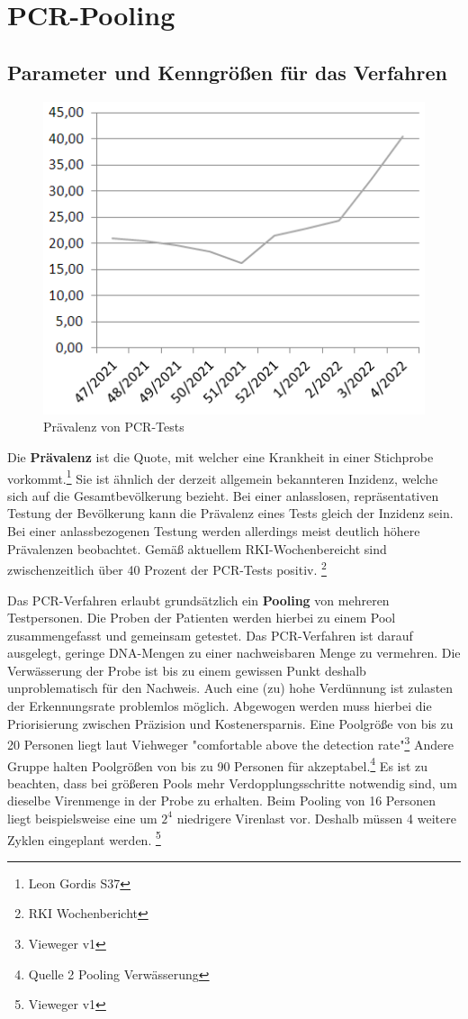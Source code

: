 \cleardoublepage
\chapter{PCR-Pooling}
\section{Parameter und Kenngrößen für das Verfahren}
\begin{figure}
	\includegraphics[width=.44\textwidth]{img/RKI_PCR_Positivrate}
	\caption{Prävalenz von PCR-Tests}
\end{figure}
Die \textbf{Prävalenz} ist die Quote, mit welcher eine Krankheit in einer Stichprobe vorkommt.\footnote{Leon Gordis S37}
Sie ist ähnlich der derzeit allgemein bekannteren Inzidenz, welche sich auf die Gesamtbevölkerung bezieht.
Bei einer anlasslosen, repräsentativen Testung der Bevölkerung kann die Prävalenz eines Tests gleich der Inzidenz sein.
Bei einer anlassbezogenen Testung werden allerdings meist deutlich höhere Prävalenzen beobachtet.
Gemäß aktuellem RKI-Wochenbereicht sind zwischenzeitlich über 40 Prozent der PCR-Tests positiv.
\footnote{RKI Wochenbericht}

Das PCR-Verfahren erlaubt grundsätzlich ein \textbf{Pooling} von mehreren Testpersonen.
Die Proben der Patienten werden hierbei zu einem Pool zusammengefasst und gemeinsam getestet.
Das PCR-Verfahren ist darauf ausgelegt, geringe DNA-Mengen zu einer nachweisbaren Menge zu vermehren.
Die Verwässerung der Probe ist bis zu einem gewissen Punkt deshalb unproblematisch für den Nachweis.
Auch eine (zu) hohe Verdünnung ist zulasten der Erkennungsrate problemlos möglich.
Abgewogen werden muss hierbei die Priorisierung zwischen Präzision und Kostenersparnis.
Eine Poolgröße von bis zu 20 Personen liegt laut Viehweger "comfortable above the detection rate"\footnote{Vieweger v1}
Andere Gruppe halten Poolgrößen von bis zu 90 Personen für akzeptabel.\footnote{Quelle 2 Pooling Verwässerung}
Es ist zu beachten, dass bei größeren Pools mehr Verdopplungsschritte notwendig sind, um dieselbe Virenmenge in der Probe zu erhalten.
Beim Pooling von 16 Personen liegt beispielsweise eine um $2^{4}$ niedrigere Virenlast vor.
Deshalb müssen 4 weitere Zyklen eingeplant werden.
\footnote{Vieweger v1}

